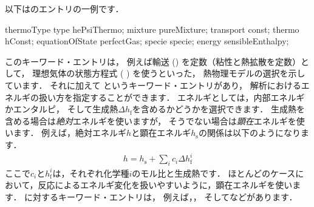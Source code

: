 以下はのエントリの一例です．
\begin{OFverbatim}[file]
thermoType
{
    type            hePsiThermo;
    mixture         pureMixture;
    transport       const;
    thermo          hConst;
    equationOfState perfectGas;
    specie          specie;
    energy          sensibleEnthalpy;
}
\end{OFverbatim}
このキーワード・エントリは，
例えば輸送 () を定数（粘性と熱拡散を定数）として，
理想気体の状態方程式 (
%
%
) を使うといった，
熱物理モデルの選択を示しています．
それに加えて
%
%
というキーワード・エントリがあり，
解析におけるエネルギの扱い方を指定することができます．
エネルギとしては，内部エネルギかエンタルピ，
そして生成熱$\Delta h_{\mathrm{f}}$を含めるかどうかを選択できます．
生成熱を含める場合は\emph{絶対}エネルギを使いますが，
そうでない場合は\emph{顕在}エネルギを使います．
例えば，絶対エネルギ$h$と顕在エネルギ$h_{\mathrm{s}}$の関係は以下のようになります．
\begin{align}
 \label{eq:7.1@2.2.0}
 h = h_{\mathrm{s}} + \sum_{i}c_{i}\Delta h_{\mathrm{f}}^{i}
\end{align}
ここで$c_{i}$と$h_{\mathrm{f}}^{i}$は，それぞれ化学種$i$のモル比と生成熱です．
ほとんどのケースにおいて，反応によるエネルギ変化を扱いやすいように，顕在エネルギを使います．
%
%
に対するキーワード・エントリは，
例えば，，
そしてなどがあります．


